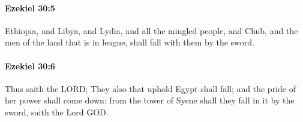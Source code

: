 		\paragraph{Ezekiel 30:5} %
			\label{EZEKIEL-30-5}

			Ethiopia, and Libya, and Lydia, and all the mingled people, and Chub, and the men of the land that is in league, shall fall with them by the sword.


		\paragraph{Ezekiel 30:6} %
			\label{EZEKIEL-30-6}

			Thus saith the LORD; They also that uphold Egypt shall fall; and the pride of her power shall come down: from the tower of Syene shall they fall in it by the sword, saith the Lord GOD.


